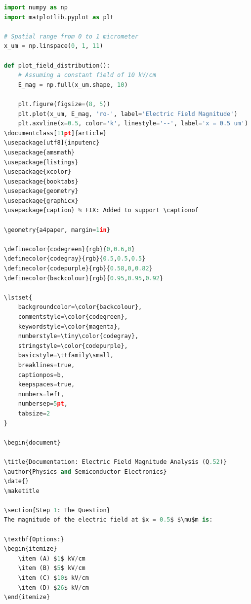 \documentclass[11pt]{article}
\begin{document}
\begin{lstlisting}[language=Python]
import numpy as np
import matplotlib.pyplot as plt

# Spatial range from 0 to 1 micrometer
x_um = np.linspace(0, 1, 11)

def plot_field_distribution():
    # Assuming a constant field of 10 kV/cm
    E_mag = np.full(x_um.shape, 10)

    plt.figure(figsize=(8, 5))
    plt.plot(x_um, E_mag, 'ro-', label='Electric Field Magnitude')
    plt.axvline(x=0.5, color='k', linestyle='--', label='x = 0.5 um')
\documentclass[11pt]{article}
\usepackage[utf8]{inputenc}
\usepackage{amsmath}
\usepackage{listings}
\usepackage{xcolor}
\usepackage{booktabs}
\usepackage{geometry}
\usepackage{graphicx}
\usepackage{caption} % FIX: Added to support \captionof

\geometry{a4paper, margin=1in}

\definecolor{codegreen}{rgb}{0,0.6,0}
\definecolor{codegray}{rgb}{0.5,0.5,0.5}
\definecolor{codepurple}{rgb}{0.58,0,0.82}
\definecolor{backcolour}{rgb}{0.95,0.95,0.92}

\lstset{
    backgroundcolor=\color{backcolour},   
    commentstyle=\color{codegreen},
    keywordstyle=\color{magenta},
    numberstyle=\tiny\color{codegray},
    stringstyle=\color{codepurple},
    basicstyle=\ttfamily\small,
    breaklines=true,                 
    captionpos=b,                    
    keepspaces=true,                 
    numbers=left,                    
    numbersep=5pt,                  
    tabsize=2
}

\begin{document}

\title{Documentation: Electric Field Magnitude Analysis (Q.52)}
\author{Physics and Semiconductor Electronics}
\date{}
\maketitle

\section{Step 1: The Question}
The magnitude of the electric field at $x = 0.5$ $\mu$m is:

\textbf{Options:}
\begin{itemize}
    \item (A) $1$ kV/cm
    \item (B) $5$ kV/cm
    \item (C) $10$ kV/cm
    \item (D) $26$ kV/cm
\end{itemize}


\end{lstlisting}
\end{document}
